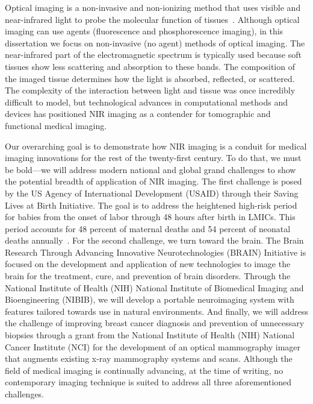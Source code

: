 Optical imaging is a non-invasive and non-ionizing method that uses visible and near-infrared light to probe the molecular function of tissues~\cite{Nunez2018}. Although optical imaging can use agents (fluorescence and phosphorescence imaging), in this dissertation we focus on non-invasive (no agent) methods of optical imaging. The near-infrared part of the electromagnetic spectrum is typically used because soft tissues show less scattering and absorption to these bands. The composition of the imaged tissue determines how the light is absorbed, reflected, or scattered. The complexity of the interaction between light and tissue was once incredibly difficult to model, but technological advances in computational methods and devices has positioned NIR imaging as a contender for tomographic and functional medical imaging.

Our overarching goal is to demonstrate how NIR imaging is a conduit for medical imaging innovations for the rest of the twenty-first century. To do that, we must be bold---we will address modern national and global grand challenges to show the potential breadth of application of NIR imaging. The first challenge is posed by the US Agency of International Development (USAID) through their Saving Lives at Birth Initiative. The goal is to address the heightened high-risk period for babies from the onset of labor through 48 hours after birth in LMICs. This period accounts for 48 percent of maternal deaths and 54 percent of neonatal deaths annually~\cite{SLAB2021}. For the second challenge, we turn toward the brain. The Brain Research Through Advancing Innovative Neurotechnologies (BRAIN) Initiative is focused on the development and application of new technologies to image the brain for the treatment, cure, and prevention of brain disorders. Through the National Institute of Health (NIH) National Institute of Biomedical Imaging and Bioengineering (NIBIB), we will develop a portable neuroimaging system with features tailored towards use in natural environments. And finally, we will address the challenge of improving breast cancer diagnosis and prevention of unnecessary biopsies through a grant from the National Institute of Health (NIH) National Cancer Institute (NCI) for the development of an optical mammography imager that augments existing x-ray mammography systems and scans. Although the field of medical imaging is continually advancing, at the time of writing, no contemporary imaging technique is suited to address all three aforementioned challenges. 


